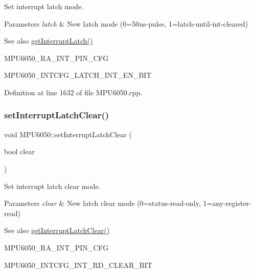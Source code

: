 Set interrupt latch mode. 


\begin{DoxyParams}{Parameters}
{\em latch} & New latch mode (0=50us-\/pulse, 1=latch-\/until-\/int-\/cleared) \\
\hline
\end{DoxyParams}
\begin{DoxySeeAlso}{See also}
\mbox{\hyperlink{classMPU6050_a5502c4c2a9bc4ea9267e128b7743923d}{get\+Interrupt\+Latch()}} 

M\+P\+U6050\+\_\+\+R\+A\+\_\+\+I\+N\+T\+\_\+\+P\+I\+N\+\_\+\+C\+FG 

M\+P\+U6050\+\_\+\+I\+N\+T\+C\+F\+G\+\_\+\+L\+A\+T\+C\+H\+\_\+\+I\+N\+T\+\_\+\+E\+N\+\_\+\+B\+IT 
\end{DoxySeeAlso}


Definition at line 1632 of file M\+P\+U6050.\+cpp.

\mbox{\label{classMPU6050_a2fa64c7030242aac18bd6727e8ca4a54}} 
\subsubsection{\texorpdfstring{setInterruptLatchClear()}{setInterruptLatchClear()}}
{\footnotesize\ttfamily void M\+P\+U6050\+::set\+Interrupt\+Latch\+Clear (\begin{DoxyParamCaption}\item[{bool}]{clear }\end{DoxyParamCaption})}



Set interrupt latch clear mode. 


\begin{DoxyParams}{Parameters}
{\em clear} & New latch clear mode (0=status-\/read-\/only, 1=any-\/register-\/read) \\
\hline
\end{DoxyParams}
\begin{DoxySeeAlso}{See also}
\mbox{\hyperlink{classMPU6050_a9a098a607e20c64b60e155da35b8264f}{get\+Interrupt\+Latch\+Clear()}} 

M\+P\+U6050\+\_\+\+R\+A\+\_\+\+I\+N\+T\+\_\+\+P\+I\+N\+\_\+\+C\+FG 

M\+P\+U6050\+\_\+\+I\+N\+T\+C\+F\+G\+\_\+\+I\+N\+T\+\_\+\+R\+D\+\_\+\+C\+L\+E\+A\+R\+\_\+\+B\+IT 
\end{DoxySeeAlso}


